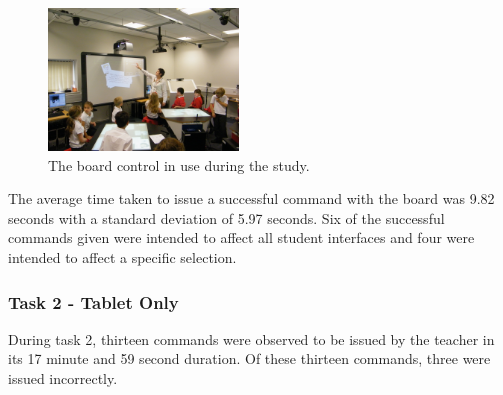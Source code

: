 \documentclass[link]{IWCOMP}
\begin{document}
\begin{figure}[h]
   \centering
   \includegraphics[width=0.45\textwidth]{figures/new_study_board.png}
   \caption{The board control in use during the study.}
   \label{fig:studyBoard}
\end{figure}

The average time taken to issue a successful command with the board was 9.82 seconds with a standard deviation of 5.97 seconds.
Six of the successful commands given were intended to affect all student interfaces and four were intended to affect a specific selection.

\subsubsection{Task 2 - Tablet Only}
\label{subsubsec:studyPhase2ResultsTask2}

During task 2, thirteen commands were observed to be issued by the teacher in its 17 minute and 59 second duration.
Of these thirteen commands, three were issued incorrectly.
\end{document}
